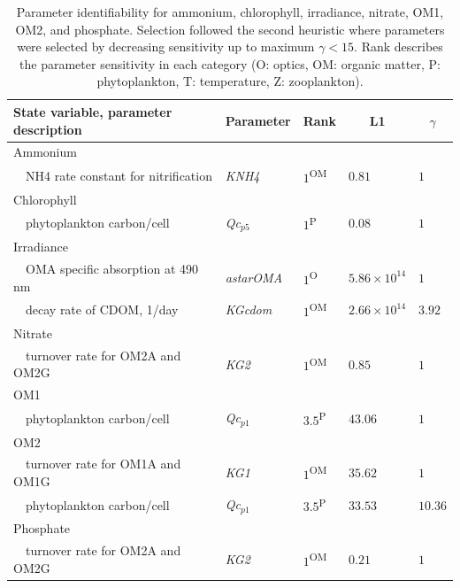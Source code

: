\documentclass[letterpaper,12pt,oneside]{article}\usepackage[]{graphicx}\usepackage[]{color}
\begin{document}
\begin{table}[!tbp]
{\footnotesize
\caption{Parameter identifiability for ammonium, chlorophyll, irradiance, nitrate, OM1, OM2, and phosphate.  Selection followed the second heuristic where parameters were selected by decreasing sensitivity up to maximum $\gamma < 15$.  Rank describes the parameter sensitivity in each category (O: optics, OM: organic matter, P: phytoplankton, T: temperature, Z: zooplankton).\label{tab:identall2}} 
\begin{center}
\begin{tabular}{lllll}
\hline\hline
\multicolumn{1}{l}{State variable, parameter description}&\multicolumn{1}{c}{Parameter}&\multicolumn{1}{c}{Rank}&\multicolumn{1}{c}{L1}&\multicolumn{1}{c}{$\gamma$}\tabularnewline
\hline
{Ammonium}&&&&\tabularnewline
~~\scriptsize{NH4 rate constant for nitrification}&\scriptsize{\textit{KNH4}}&$1$\textsuperscript{OM}&$0.81$&$1$\tabularnewline
\hline
{Chlorophyll}&&&&\tabularnewline
~~\scriptsize{phytoplankton carbon/cell}&\scriptsize{\textit{Qc$_{p5}$}}&$1$\textsuperscript{P}&$0.08$&$1$\tabularnewline
\hline
{Irradiance}&&&&\tabularnewline
~~\scriptsize{OMA specific absorption at 490 nm}&\scriptsize{\textit{astarOMA}}&$1$\textsuperscript{O}&$5.86\times 10^{14}$&$1$\tabularnewline
~~\scriptsize{decay rate of CDOM, 1/day}&\scriptsize{\textit{KGcdom}}&$1$\textsuperscript{OM}&$2.66\times 10^{14}$&$3.92$\tabularnewline
\hline
{Nitrate}&&&&\tabularnewline
~~\scriptsize{turnover rate for OM2A and OM2G}&\scriptsize{\textit{KG2}}&$1$\textsuperscript{OM}&$0.85$&$1$\tabularnewline
\hline
{OM1}&&&&\tabularnewline
~~\scriptsize{phytoplankton carbon/cell}&\scriptsize{\textit{Qc$_{p1}$}}&$3.5$\textsuperscript{P}&$43.06$&$1$\tabularnewline
\hline
{OM2}&&&&\tabularnewline
~~\scriptsize{turnover rate for OM1A and OM1G}&\scriptsize{\textit{KG1}}&$1$\textsuperscript{OM}&$35.62$&$1$\tabularnewline
~~\scriptsize{phytoplankton carbon/cell}&\scriptsize{\textit{Qc$_{p1}$}}&$3.5$\textsuperscript{P}&$33.53$&$10.36$\tabularnewline
\hline
{Phosphate}&&&&\tabularnewline
~~\scriptsize{turnover rate for OM2A and OM2G}&\scriptsize{\textit{KG2}}&$1$\textsuperscript{OM}&$0.21$&$1$\tabularnewline
\hline
\end{tabular}\end{center}}

\end{table}
\end{document}
